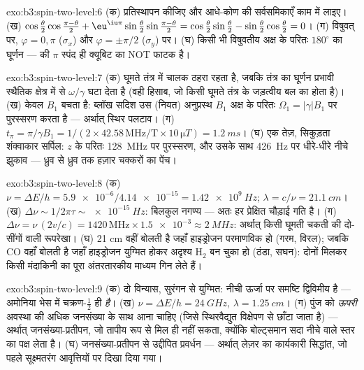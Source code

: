 \begin{solution}{exo:b3:spin-two-level:6}
(क) प्रतिस्थापन कीजिए और आधे-कोण की सर्वसमिकाएँ काम में लाइए। (ख)
$\cos\tfrac\theta2\cos\tfrac{\pi-\theta}2 +
\eu^{\iu\pi}\sin\tfrac\theta2\sin\tfrac{\pi-\theta}2 =
\cos\tfrac\theta2\sin\tfrac\theta2 -
\sin\tfrac\theta2\cos\tfrac\theta2 = 0$। (ग) विषुवत् पर,
$\varphi = 0, \pi$ ($\sigma_x$) और $\varphi = \pm\pi/2$
($\sigma_y$) पर। (घ) किसी भी विषुवतीय अक्ष के परितः $180^\circ$ का घूर्णन
---  की $\pi$ स्पंद ही क्यूबिट का NOT फाटक है।
\end{solution}

\begin{solution}{exo:b3:spin-two-level:7}
(क) घूमते तंत्र में चालक ठहरा रहता है, जबकि तंत्र का
घूर्णन प्रभावी स्थैतिक क्षेत्र में से $\omega/\gamma$ घटा देता है
(वही हिसाब, जो किसी घूमते तंत्र के जड़त्वीय बल का होता है)। (ख) केवल
$B_1$ बचता है: ब्लॉख सदिश उस (नियत)
अनुप्रस्थ $B_1$ अक्ष के परितः $\Omega_1 = |\gamma|B_1$ पर पुरस्सरण
करता है --- अर्थात् स्थिर पलटाव। (ग) $t_\pi = \pi/\gamma B_1 = 1/(2 \times 42.58\,\text{
MHz/T} \times 10\,\unit{\micro T}) = \qty{1.2}{ms}$। (घ) एक तेज़,
सिकुड़ता शंक्वाकार सर्पिल: $z$ के परितः \qty{128}{MHz} पर पुरस्सरण,
और उसके साथ \qty{426}{Hz} पर धीरे-धीरे नीचे झुकाव --- ध्रुव से ध्रुव
तक हज़ार चक्करों का पेंच।
\end{solution}

\begin{solution}{exo:b3:spin-two-level:8}
(क) $\nu = \Delta E/h = \num{5.9e-6}/\num{4.14e-15} =
\qty{1.42e9}{Hz}$; $\lambda = c/\nu = \qty{21.1}{cm}$। (ख) $\Delta
\nu \sim 1/2\pi\tau \sim \qty{e-15}{Hz}$: बिलकुल नगण्य ---
अतः हर प्रेक्षित चौड़ाई गति है। (ग) $\Delta\nu =
\nu\,(2v/c) = 1420\,\text{MHz} \times \num{1.5e-3} \approx
\qty{2}{MHz}$: अर्थात् किसी घूमती चकती की दो-सींगों वाली रूपरेखा। (घ)
21 cm वहीं बोलती है जहाँ हाइड्रोजन परमाणविक हो (गरम, विरल); जबकि CO
वहाँ बोलती है जहाँ हाइड्रोजन युग्मित होकर अदृश्य H$_2$ बन चुका हो
(ठंडा, सघन): दोनों मिलकर किसी मंदाकिनी का पूरा अंतरतारकीय
माध्यम गिन लेते हैं।
\end{solution}

\begin{solution}{exo:b3:spin-two-level:9}
(क) दो विन्यास, सुरंगन से युग्मित: नीची ऊर्जा पर समष्टि
द्विविमीय है --- अमोनिया भेस में चक्रण-$\tfrac12$ ही \emph{है}। (ख) $\nu = \Delta E/h = \qty{24}{GHz}$, $\lambda =
\qty{1.25}{cm}$। (ग) पुंज को \emph{ऊपरी} अवस्था की अधिक जनसंख्या के
साथ आना चाहिए (जिसे स्थिरवैद्युत विक्षेपण से छाँटा जाता है) ---
अर्थात् जनसंख्या-प्रतीपन, जो तापीय रूप से मिल ही नहीं सकता, क्योंकि
बोल्ट्समान सदा नीचे वाले स्तर का पक्ष लेता है। (घ) जनसंख्या-प्रतीपन से
उद्दीपित प्रवर्धन --- अर्थात् लेज़र का कार्यकारी सिद्धांत, जो पहले
सूक्ष्मतरंग आवृत्तियों पर दिखा दिया गया।
\end{solution}

